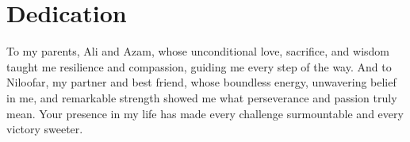 \documentclass[./dissertation.tex]{subfiles}
\begin{document}
\chapter*{Dedication}
To my parents, Ali and Azam, whose unconditional love, sacrifice, and wisdom taught me resilience and compassion, guiding me every step of the way. And to Niloofar, my partner and best friend, whose boundless energy, unwavering belief in me, and remarkable strength showed me what perseverance and passion truly mean. Your presence in my life has made every challenge surmountable and every victory sweeter.


\end{document}
